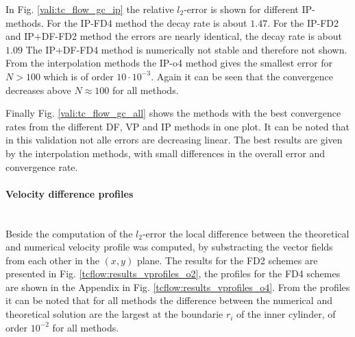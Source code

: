 In Fig. \ref{vali:tc_flow_gc_ip} the relative $l_2$-error is shown for different IP-methods.
For the IP-FD4 method the decay rate is about $1.47$.
For the IP-FD2 and IP+DF-FD2 method the errors are nearly  identical, the decay rate is about $1.09$
The IP+DF-FD4 method is numerically not stable and therefore not shown.
From the interpolation methods the IP-o4 method gives the smallest error for $N>100$ which is of order $10 \cdot 10^{-3}$.
Again it can be seen that the convergence decreases above $N\approx100$ for all methods.


Finally Fig. \ref{vali:tc_flow_gc_all} shows the methods with the best convergence
rates from the different DF, VP and IP methods in one plot.
It can be noted that in this validation not alle errors are decreasing linear.
The best results are given by the interpolation methods, with small differences in the overall error
and convergence rate.

\paragraph{Velocity difference profiles}\mbox{}\\

Beside the computation of the $l_2$-error the local difference between the theoretical and numerical velocity
profile was computed, by substracting the vector fields from each other in the $(x, y)$ plane.
The results for the FD2 schemes are presented in Fig. \ref{tcflow:results_vprofiles_o2}, the profiles
for the FD4 schemes are shown in the Appendix in Fig. \ref{tcflow:results_vprofiles_o4}.
From the profiles it can be noted that for all methods the difference between the numerical and
theoretical solution are the largest at the boundarie $r_i$ of the  inner cylinder,
of order $10^{-2}$ for all methods.

